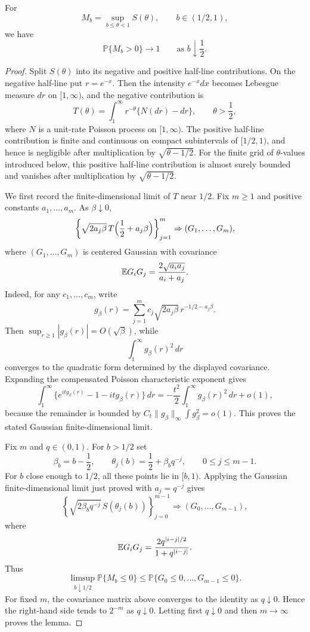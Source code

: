 \begin{lemma}
\label{lem:poisson-left-endpoint}
For
\[
    M_b=\sup_{b\le\theta<1}S(\theta),
    \qquad
    b\in(1/2,1),
\]
we have
\[
    \mathbb P\{M_b>0\}\to1
    \qquad\text{as }b\downarrow\frac12.
\]
\end{lemma}

\begin{proof}
Split $S(\theta)$ into its negative and positive half-line contributions. On the negative half-line put $r=e^{-x}$. Then the intensity $e^{-x}dx$ becomes Lebesgue measure $dr$ on $[1,\infty)$, and the negative contribution is
\[
    T(\theta)
    =
    \int_1^\infty r^{-\theta}\{N(dr)-dr\},
    \qquad \theta>\frac12,
\]
where $N$ is a unit-rate Poisson process on $[1,\infty)$. The positive half-line contribution is finite and continuous on compact subintervals of $[1/2,1)$, and hence is negligible after multiplication by $\sqrt{\theta-1/2}$. For the finite grid of \(\theta\)-values introduced below, this positive half-line contribution is almost surely bounded and vanishes after multiplication by \(\sqrt{\theta-1/2}\).

We first record the finite-dimensional limit of $T$ near $1/2$. Fix $m\ge1$ and positive constants $a_1,\dots,a_m$. As $\beta\downarrow0$,
\[
    \left\{
        \sqrt{2a_j\beta}\,
        T\Bigl(\frac12+a_j\beta\Bigr)
    \right\}_{j=1}^m
    \Rightarrow
    (G_1,\dots,G_m),
\]
where $(G_1,\dots,G_m)$ is centered Gaussian with covariance
\[
    \mathbb{E} G_iG_j
    =
    \frac{2\sqrt{a_ia_j}}{a_i+a_j}.
\]
Indeed, for any $c_1,\dots,c_m$, write
\[
 g_\beta(r)=
 \sum_{j=1}^m c_j\sqrt{2a_j\beta}\,
 r^{-1/2-a_j\beta}.
\]
Then \(\sup_{r\ge1}|g_\beta(r)|=O(\sqrt\beta)\), while
\[
 \int_1^\infty g_\beta(r)^2\,dr
\]
converges to the quadratic form determined by the displayed covariance.
Expanding the compensated Poisson characteristic exponent gives
\[
 \int_1^\infty
 \{e^{it g_\beta(r)}-1-itg_\beta(r)\}\,dr
 =
 -\frac{t^2}{2}\int_1^\infty g_\beta(r)^2\,dr+o(1),
\]
because the remainder is bounded by
\(C_t\|g_\beta\|_\infty\int g_\beta^2=o(1)\). This proves the stated
Gaussian finite-dimensional limit.

Fix $m$ and $q\in(0,1)$. For $b>1/2$ set
\[
    \beta_b=b-\frac12,
    \qquad
    \theta_j(b)=\frac12+\beta_b q^{-j},
    \qquad
    0\le j\le m-1.
\]
For $b$ close enough to $1/2$, all these points lie in $[b,1)$. Applying the
Gaussian finite-dimensional limit just proved with $a_j=q^{-j}$ gives
\[
    \left\{
        \sqrt{2\beta_b q^{-j}}\,
        S(\theta_j(b))
    \right\}_{j=0}^{m-1}
    \Rightarrow
    (G_0,\dots,G_{m-1}),
\]
where
\[
    \mathbb{E} G_iG_j
    =
    \frac{2q^{|i-j|/2}}{1+q^{|i-j|}}.
\]
Thus
\[
    \limsup_{b\downarrow1/2}\mathbb P\{M_b\le0\}
    \le
    \mathbb P\{G_0\le0,\dots,G_{m-1}\le0\}.
\]
For fixed $m$, the covariance matrix above converges to the identity as $q\downarrow0$. Hence the right-hand side tends to $2^{-m}$ as $q\downarrow0$. Letting first $q\downarrow0$ and then $m\to\infty$ proves the lemma.
\end{proof}
